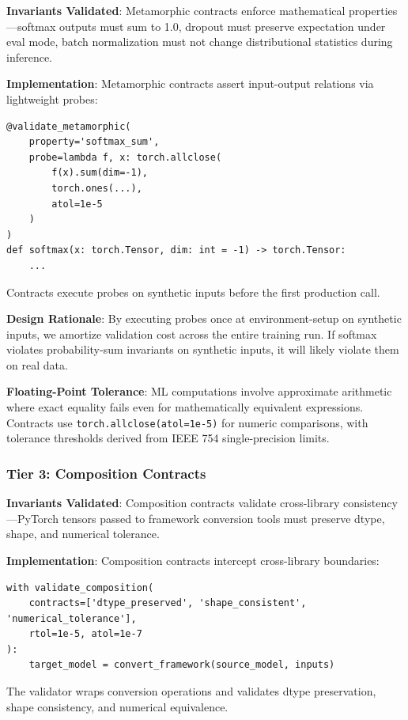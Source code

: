 \textbf{Invariants Validated}: Metamorphic contracts enforce mathematical properties---softmax outputs must sum to 1.0, dropout must preserve expectation under eval mode, batch normalization must not change distributional statistics during inference.

\textbf{Implementation}: Metamorphic contracts assert input-output relations via lightweight probes:

\begin{verbatim}
@validate_metamorphic(
    property='softmax_sum',
    probe=lambda f, x: torch.allclose(
        f(x).sum(dim=-1), 
        torch.ones(...), 
        atol=1e-5
    )
)
def softmax(x: torch.Tensor, dim: int = -1) -> torch.Tensor:
    ...
\end{verbatim}

Contracts execute probes on synthetic inputs before the first production call.

\textbf{Design Rationale}: By executing probes once at environment-setup on synthetic inputs, we amortize validation cost across the entire training run. If softmax violates probability-sum invariants on synthetic inputs, it will likely violate them on real data.

\textbf{Floating-Point Tolerance}: ML computations involve approximate arithmetic where exact equality fails even for mathematically equivalent expressions. Contracts use \texttt{torch.allclose(atol=1e-5)} for numeric comparisons, with tolerance thresholds derived from IEEE 754 single-precision limits.

\subsubsection{Tier 3: Composition Contracts}

\textbf{Invariants Validated}: Composition contracts validate cross-library consistency---PyTorch tensors passed to framework conversion tools must preserve dtype, shape, and numerical tolerance.

\textbf{Implementation}: Composition contracts intercept cross-library boundaries:

\begin{verbatim}
with validate_composition(
    contracts=['dtype_preserved', 'shape_consistent', 'numerical_tolerance'],
    rtol=1e-5, atol=1e-7
):
    target_model = convert_framework(source_model, inputs)
\end{verbatim}

The validator wraps conversion operations and validates dtype preservation, shape consistency, and numerical equivalence.

